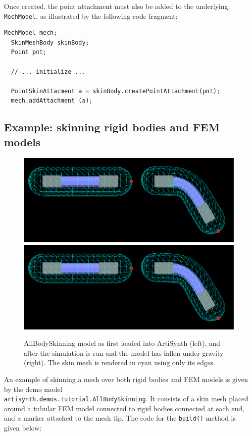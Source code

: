 Once created, the point attachment must also be added to the
underlying {\tt MechModel}, as illustrated by the following code
fragment:
%
\begin{lstlisting}[]
  MechModel mech;
  SkinMeshBody skinBody;
  Point pnt;

  // ... initialize ...

  PointSkinAttacment a = skinBody.createPointAttachment(pnt);
  mech.addAttachment (a);
\end{lstlisting}
%

\subsection{Example: skinning rigid bodies and FEM models}

\begin{figure}[t]
\begin{center}
\iflatexml
 \includegraphics[]{images/AllBodySkinning}
\else
 \includegraphics[width=6in]{images/AllBodySkinning}
\fi
\end{center}
\caption{AllBodySkinning model as first loaded into ArtiSynth (left),
and after the simulation is run and the model has fallen under gravity
(right). The skin mesh is rendered in cyan using only its edges.}
\label{AllBodySkinning:fig}
\end{figure}

An example of skinning a mesh over both rigid bodies and FEM models is
given by the demo model\\
{\tt artisynth.demos.tutorial.AllBodySkinning}.  It consists
of a skin mesh placed around a tubular FEM model
connected to rigid bodies connected at each end, and a
marker attached to the mesh tip.
The code for the {\tt build()} method is given below:
\lstset{numbers=left} \iflatexml
  
\else
  
\fi
\lstset{numbers=none}

